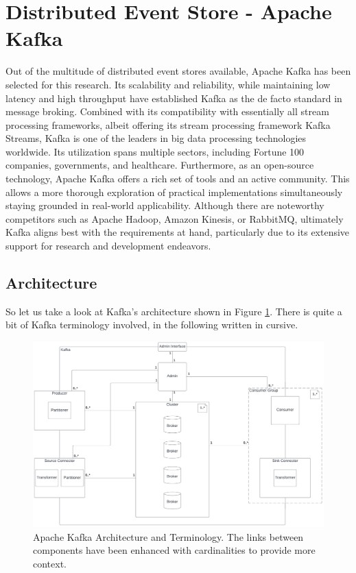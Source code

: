 \section{Distributed Event Store - Apache Kafka}
Out of the multitude of distributed event stores available, Apache Kafka has been selected for this research. Its scalability and reliability, while maintaining low latency and high throughput have established Kafka as the de facto standard in message broking. Combined with its compatibility with essentially all stream processing frameworks, albeit offering its stream processing framework Kafka Streams, Kafka is one of the leaders in big data processing technologies worldwide. Its utilization spans multiple sectors, including Fortune 100 companies, governments, and healthcare. Furthermore, as an open-source technology, Apache Kafka offers a rich set of tools and an active community. This allows a more thorough exploration of practical implementations simultaneously staying grounded in real-world applicability. Although there are noteworthy competitors such as Apache Hadoop, Amazon Kinesis, or RabbitMQ, ultimately Kafka aligns best with the requirements at hand, particularly due to its extensive support for research and development endeavors.

\subsection{Architecture}
So let us take a look at Kafka's architecture shown in Figure \ref{fig:kafka}. There is quite a bit of Kafka terminology involved, in the following written in cursive. 

\begin{figure}[ht]
   \begin{adjustbox}{center}
   \includegraphics[width=0.8\pdfpagewidth]{img/Kafka_Diagram.pdf}
   \end{adjustbox}
   \caption{Apache Kafka Architecture and Terminology. The links between components have been enhanced with cardinalities to provide more context. \label{fig:kafka}}
\end{figure}

